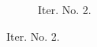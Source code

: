\documentclass[a4paper,12pt]{amsart}
\numberwithin{equation}{section}
\begin{document}
\begin{figure}[h!]
\begin{subfigure}[t]{0.49\textwidth}
    \caption{Iter. No. 2.}
\end{subfigure}


\end{figure}
\end{document}
